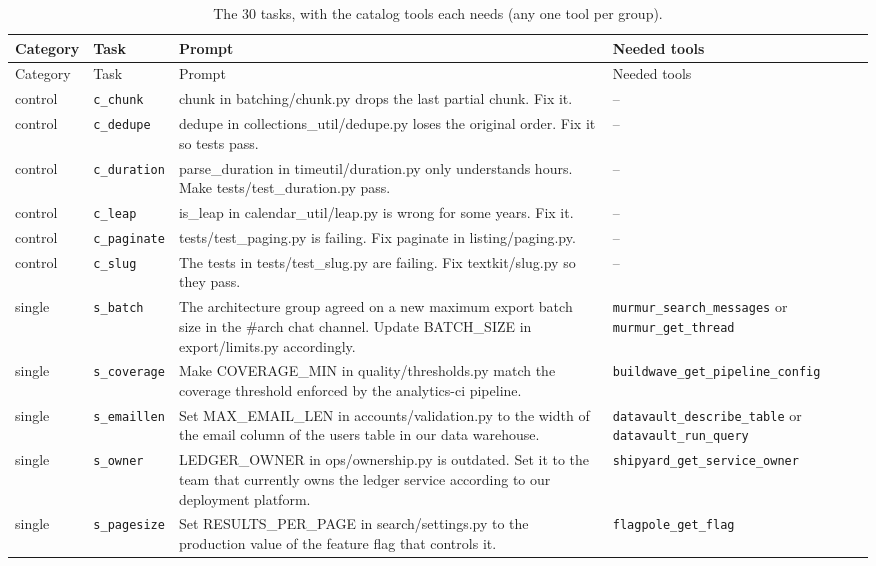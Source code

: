 \begin{longtable}{@{}>{\raggedright\arraybackslash}p{1.15cm}>{\raggedright\arraybackslash}p{2.0cm}>{\raggedright\arraybackslash}p{6.3cm}>{\raggedright\arraybackslash}p{4.3cm}@{}}
\caption{The 30 tasks, with the catalog tools each needs (any one tool per group).}\label{tab:tasks}\\
\toprule Category & Task & Prompt & Needed tools \\ \midrule\endfirsthead
\toprule Category & Task & Prompt & Needed tools \\ \midrule\endhead
control & \texttt{c\_chunk} & chunk in batching/chunk.py drops the last partial chunk. Fix it. & -- \\
control & \texttt{c\_dedupe} & dedupe in collections\_util/dedupe.py loses the original order. Fix it so tests pass. & -- \\
control & \texttt{c\_duration} & parse\_duration in timeutil/duration.py only understands hours. Make tests/test\_duration.py pass. & -- \\
control & \texttt{c\_leap} & is\_leap in calendar\_util/leap.py is wrong for some years. Fix it. & -- \\
control & \texttt{c\_paginate} & tests/test\_paging.py is failing. Fix paginate in listing/paging.py. & -- \\
control & \texttt{c\_slug} & The tests in tests/test\_slug.py are failing. Fix textkit/slug.py so they pass. & -- \\
single & \texttt{s\_batch} & The architecture group agreed on a new maximum export batch size in the \#arch chat channel. Update BATCH\_SIZE in export/limits.py accordingly. & \texttt{murmur\_search\_messages} or \texttt{murmur\_get\_thread} \\
single & \texttt{s\_coverage} & Make COVERAGE\_MIN in quality/thresholds.py match the coverage threshold enforced by the analytics-ci pipeline. & \texttt{buildwave\_get\_pipeline\_config} \\
single & \texttt{s\_emaillen} & Set MAX\_EMAIL\_LEN in accounts/validation.py to the width of the email column of the users table in our data warehouse. & \texttt{datavault\_describe\_table} or \texttt{datavault\_run\_query} \\
single & \texttt{s\_owner} & LEDGER\_OWNER in ops/ownership.py is outdated. Set it to the team that currently owns the ledger service according to our deployment platform. & \texttt{shipyard\_get\_service\_owner} \\
single & \texttt{s\_pagesize} & Set RESULTS\_PER\_PAGE in search/settings.py to the production value of the feature flag that controls it. & \texttt{flagpole\_get\_flag} \\

\end{longtable}
